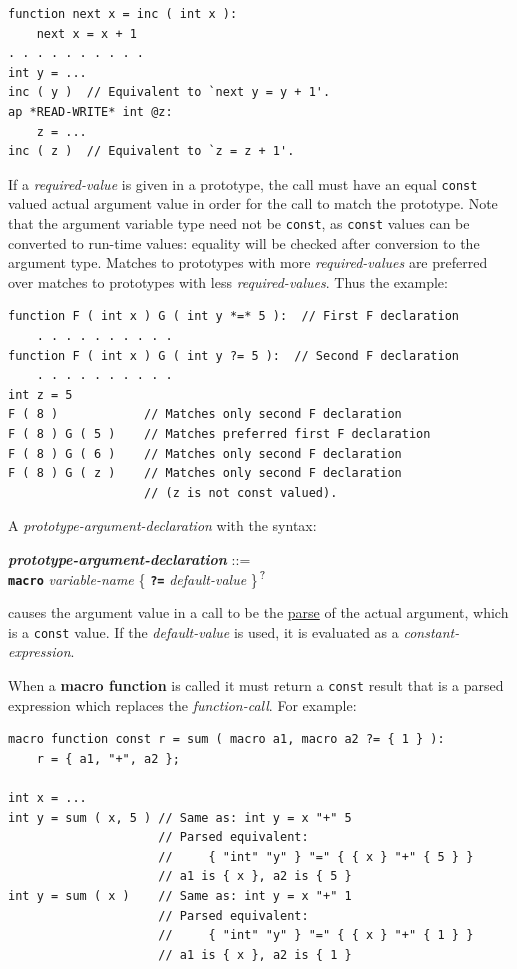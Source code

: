 \documentclass[12pt]{article}
\newcommand{\TT}[1]{{\tt \bfseries #1}}
\newcommand{\QMARK}{{$^{\,\mbox{\footnotesize ?}}$}}
\newcommand{\key}[1]{{\rm \bfseries #1}}
\newcommand{\emkey}[1]{{\em \bfseries #1}}
\newenvironment{indpar}[1][0.3in]%
	{\begin{list}{}%
		     {\setlength{\itemsep}{0in}%
		      \setlength{\topsep}{0in}%
		      \setlength{\parsep}{1ex}%
		      \setlength{\labelwidth}{#1}%
		      \setlength{\leftmargin}{#1}%
		      \addtolength{\leftmargin}{\labelsep}}%
	 \item}%
	{\end{list}}
\begin{document}
\begin{indpar}\begin{verbatim}
function next x = inc ( int x ):
    next x = x + 1
. . . . . . . . . .
int y = ...
inc ( y )  // Equivalent to `next y = y + 1'.
ap *READ-WRITE* int @z:
    z = ...
inc ( z )  // Equivalent to `z = z + 1'.
\end{verbatim}\end{indpar}

If a {\em required-value} is given in a prototype, the call must
have an equal {\tt const} valued actual argument value
in order for the call to match the prototype.
Note that the argument variable type need not be {\tt const},
as {\tt const} values can be converted to run-time values:
equality will be checked after conversion to the argument type.
Matches to prototypes with more {\em required-values}
are preferred over matches to prototypes with less {\em required-values}.
Thus the example:
\begin{indpar}\begin{verbatim}
function F ( int x ) G ( int y *=* 5 ):  // First F declaration
    . . . . . . . . . .
function F ( int x ) G ( int y ?= 5 ):  // Second F declaration
    . . . . . . . . . .
int z = 5
F ( 8 )            // Matches only second F declaration
F ( 8 ) G ( 5 )    // Matches preferred first F declaration
F ( 8 ) G ( 6 )    // Matches only second F declaration
F ( 8 ) G ( z )    // Matches only second F declaration
                   // (z is not const valued).
\end{verbatim}\end{indpar}

A {\em prototype-argument-declaration} with the syntax:
\begin{indpar}
\emkey{prototype-argument-declaration}\label{MACRO-ARGUMENT-DECLARATION} ::= \\
\hspace*{1in} \TT{macro} {\em variable-name}
                         \{ \TT{?=} {\em default-value} \}\QMARK{}
\end{indpar}
causes the argument value in a call to be the \underline{parse}
of the actual argument, which is a {\tt const} value.  If the
{\em default-value} is used, it is evaluated as a {\em constant-expression}.

When a \key{macro function} is called it must return a {\tt const} result
that is a parsed expression which replaces
the {\em function-call}.  For example:
\begin{indpar}\begin{verbatim}
macro function const r = sum ( macro a1, macro a2 ?= { 1 } ):
    r = { a1, "+", a2 };

int x = ...
int y = sum ( x, 5 ) // Same as: int y = x "+" 5
                     // Parsed equivalent:
                     //     { "int" "y" } "=" { { x } "+" { 5 } }
                     // a1 is { x }, a2 is { 5 }
int y = sum ( x )    // Same as: int y = x "+" 1
                     // Parsed equivalent:
                     //     { "int" "y" } "=" { { x } "+" { 1 } }
                     // a1 is { x }, a2 is { 1 }
\end{verbatim}\end{indpar}
\end{document}
